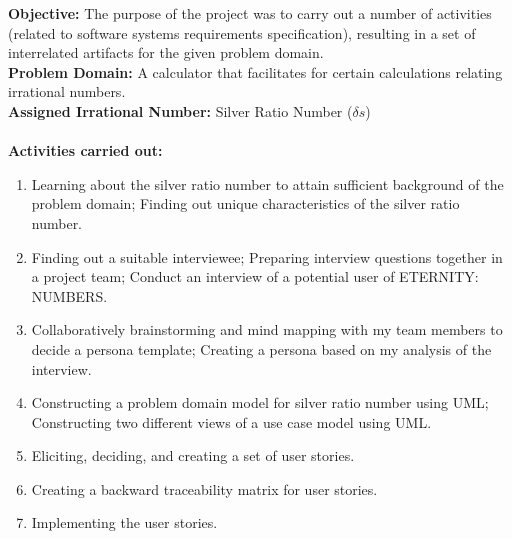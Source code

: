 \documentclass[landscape,a0paper,fontscale=0.285]{baposter} %
\newcommand{\compresslist}{ %
\setlength{\itemsep}{1pt}
\setlength{\parskip}{0pt}
\setlength{\parsep}{0pt}
}
\begin{document}
\begin{poster}
{\textbf{Objective:} The purpose of the project was to carry out a number of activities (related to software systems requirements specification), resulting in a set of interrelated artifacts for the given problem domain.\\
\textbf{Problem Domain:}  A calculator that facilitates for certain calculations relating irrational numbers. \\
\textbf{Assigned Irrational Number:} Silver Ratio Number ($\delta s$) \\ \\
\textbf{Activities carried out: }


\begin{enumerate}\compresslist
\item Learning about the silver ratio number to attain sufficient background of the problem domain; Finding out unique characteristics of the silver ratio number.
\item Finding out a suitable interviewee; Preparing interview questions together in a project team; Conduct an interview of a potential user of ETERNITY: NUMBERS.
\item Collaboratively brainstorming and mind mapping with my team members to decide a persona template; Creating a persona based on my analysis of the interview.
\item Constructing a problem domain model for silver ratio number using UML; Constructing two different views of a use case model using UML. 
\item Eliciting, deciding, and creating a set of user stories. 
\item Creating a backward traceability matrix for user stories.
\item Implementing the user stories.  
\end{enumerate}

\vspace{0.3em} %
}


\end{poster}
\end{document}
